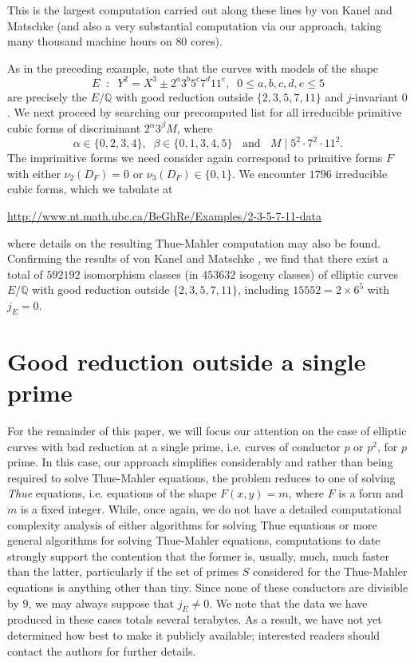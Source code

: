 This is the largest computation carried out along these lines by von Kanel and Matschke \cite{KanMat} (and also a very substantial computation via our approach, 
taking many thousand machine hours on $80$ cores).

As in the preceding example, note that
the curves with models of the shape
$$
E \; \; : \; \; Y^2 = X^3 \pm 2^a 3^b 5^c 7^d 11^e, \; \; 0 \leq a, b, c, d, e \leq 5
$$
are precisely the $E/\mathbb{Q}$  with good reduction outside $\{ 2, 3, 5, 7, 11 \}$ and $j$-invariant $0$. We next proceed  by searching our precomputed list for all irreducible primitive cubic forms of discriminant $2^{\alpha} 3^\beta M$,
where 
$$
\alpha \in \{ 0, 2, 3, 4 \}, \; \; \beta \in \{ 0, 1, 3, 4, 5 \} \; \; \mbox{ and } \; \; M \mid 5^2 \cdot 7^2 \cdot 11^2. 
$$
The imprimitive forms we need consider again correspond to primitive 
forms $F$ with either $\nu_2 (D_F) = 0$ or $\nu_3 (D_F) \in \{ 0, 1 \}$.
We encounter $1796$ irreducible cubic forms, which we tabulate at 
\begin{center}
\url{http://www.nt.math.ubc.ca/BeGhRe/Examples/2-3-5-7-11-data}
\end{center}
where details on the resulting Thue-Mahler computation may also be found. Confirming the results of von Kanel and Matschke \cite{KanMat}, we find that there exist a total of $592192$ isomorphism classes (in $453632$ isogeny classes) of elliptic curves $E/\mathbb{Q}$ with good reduction outside $\{ 2, 3, 5, 7, 11\}$, including $15552=2 \times 6^5$ with $j_E=0$.


\section{Good reduction outside a single prime} \label{primes}

For the remainder of this paper, we will focus our attention on the case of elliptic curves with bad reduction at a single prime, i.e. curves of conductor $p$ or $p^2$, for $p$ prime.
In this case, our approach simplifies considerably and 
rather than being required to solve Thue-Mahler equations, the problem reduces to one of solving \emph{Thue} equations, i.e. equations of the shape $F(x,y)=m$, where $F$ is a form and $m$ is a fixed integer. While, once again, we do not have a detailed computational complexity analysis of either algorithms for solving Thue equations or more general algorithms for solving Thue-Mahler equations, computations to date strongly support the contention that the former is, usually, much, much faster than the latter, particularly if the set of primes $S$ considered for the Thue-Mahler equations is anything other than tiny. Since none of these conductors are divisible by $9$, we may always suppose that $j_E \neq 0$. We note that the data we have produced in these cases totals several terabytes. As a result, we have not yet determined how best to make it publicly available; interested readers should contact the authors for further details.

